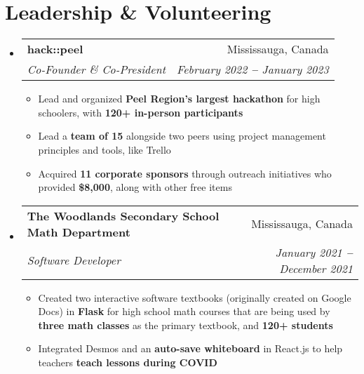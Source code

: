 \documentclass[letterpaper,11pt]{article}
\makeatletter
\newcommand{\resumeItem}[1]{
  \item\small{
    {#1 \vspace{-2pt}}
  }
}
\newcommand{\resumeSubheading}[4]{
  \vspace{-2pt}\item
    \begin{tabular*}{0.97\textwidth}[t]{l@{\extracolsep{\fill}}r}
      \textbf{#1} & #2 \\
      \textit{\small#3} & \textit{\small #4} \\
    \end{tabular*}\vspace{-7pt}
}
\newcommand{\resumeSubHeadingListStart}{\begin{itemize}[leftmargin=0.15in, label={}]}
\newcommand{\resumeSubHeadingListEnd}{\end{itemize}}
\newcommand{\resumeItemListStart}{\begin{itemize}}
\newcommand{\resumeItemListEnd}{\end{itemize}\vspace{-5pt}}
\makeatother
\begin{document}

\section{Leadership \& Volunteering}
  \vspace{3pt}
  \resumeSubHeadingListStart

    \resumeSubheading
      {hack::peel} {Mississauga, Canada}
      {Co-Founder \& Co-President} {February 2022 \textbf{--} January 2023}
        \resumeItemListStart
            \resumeItem{Lead and organized \textbf{Peel Region's largest hackathon} for high schoolers, with \textbf{120+ in-person participants}}
            \resumeItem{Lead a \textbf{team of 15} alongside two peers using project management principles and tools, like Trello}
            \resumeItem{Acquired \textbf{11 corporate sponsors} through outreach initiatives who provided \textbf{\$8,000}, along with other free items}
        \resumeItemListEnd

    \resumeSubheading
      {The Woodlands Secondary School Math Department} {Mississauga, Canada}
      {Software Developer} {January 2021 \textbf{--} December 2021}
        \resumeItemListStart
            \resumeItem{Created two interactive software textbooks (originally created on Google Docs) in \textbf{Flask} for high school math courses that are being used by \textbf{three math classes} as the primary textbook, and \textbf{120+ students}}
            \resumeItem{Integrated Desmos and an \textbf{auto-save whiteboard} in React.js to help teachers \textbf{teach lessons during COVID}}
        \resumeItemListEnd
    
  \resumeSubHeadingListEnd



      
\end{document}
